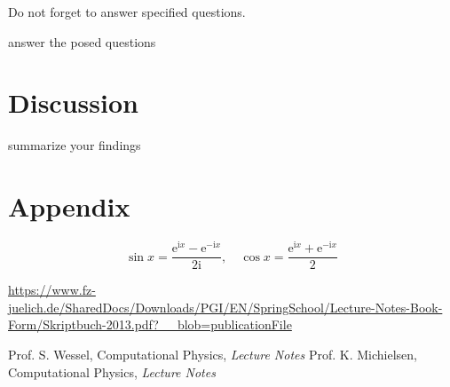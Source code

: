 \documentclass[journal]{IEEEtran} %
\begin{document}
Do not forget to answer specified questions.

answer the posed questions


\section{Discussion}


summarize your findings

\clearpage
\onecolumn
\section*{Appendix}
$$
\sin x = \frac{\mathrm{e}^{\mathrm{i}x} - \mathrm{e}^{-\mathrm{i}x}}{2\mathrm{i}}, \quad \cos x = \frac{\mathrm{e}^{\mathrm{i}x} + \mathrm{e}^{-\mathrm{i}x}}{2}
$$

\url{https://www.fz-juelich.de/SharedDocs/Downloads/PGI/EN/SpringSchool/Lecture-Notes-Book-Form/Skriptbuch-2013.pdf?__blob=publicationFile}

%

\begin{thebibliography}{10}\footnotesize

 Prof. S. Wessel, Computational Physics, {\it Lecture Notes}
 Prof. K. Michielsen, Computational Physics, {\it Lecture Notes}

\end{thebibliography}


%
%
\end{document}
